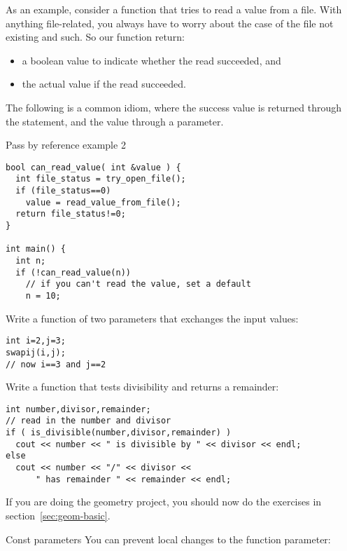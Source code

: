 As an example, consider a function that tries to read a value from a
file. With anything file-related, you always have to worry about the
case of the file not existing and such. So our function return:
\begin{itemize}
\item a boolean value to indicate whether the read succeeded, and
\item the actual value if the read succeeded.
\end{itemize}
The following is a common idiom, where the success value is returned
through the  statement, and the value through a parameter.

\begin{block}{Pass by reference example 2}
  \label{sl:pass-reference2}
\begin{verbatim}
bool can_read_value( int &value ) {
  int file_status = try_open_file();
  if (file_status==0) 
    value = read_value_from_file();
  return file_status!=0;
}

int main() {
  int n;
  if (!can_read_value(n))
    // if you can't read the value, set a default
    n = 10;
\end{verbatim}
\end{block}

\begin{exercise}
  \label{ex:swap}
  Write a function  of two parameters that exchanges the input values:
\begin{verbatim}
int i=2,j=3;
swapij(i,j);
// now i==3 and j==2
\end{verbatim}
\end{exercise}

\begin{exercise}
  \label{ex:div-remain}
  Write a function that tests divisibility and returns a remainder:

{\small
\begin{verbatim}
int number,divisor,remainder;
// read in the number and divisor
if ( is_divisible(number,divisor,remainder) )
  cout << number << " is divisible by " << divisor << endl;
else
  cout << number << "/" << divisor <<
      " has remainder " << remainder << endl;
\end{verbatim}
}
\end{exercise}

If you are doing the geometry project, you should now do the exercises
in section~\ref{sec:geom-basic}.

\begin{block}{Const parameters}
  You can prevent local changes to the function parameter:

\end{block}

